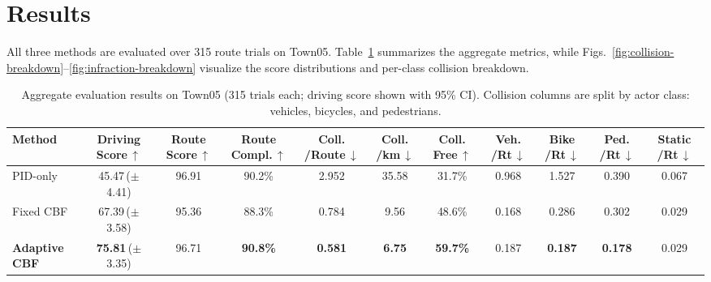 \section{Results}
\label{results}

All three methods are evaluated over 315 route trials on Town05. Table~\ref{tab:main-results} summarizes the aggregate metrics, while Figs.~\ref{fig:collision-breakdown}--\ref{fig:infraction-breakdown} visualize the score distributions and per-class collision breakdown.

\begin{table}[!htbp]
\centering
\caption{Aggregate evaluation results on Town05 (315 trials each; driving score shown with 95\% CI). Collision columns are split by actor class: vehicles, bicycles, and pedestrians.}
\label{tab:main-results}
{\scriptsize
\setlength{\tabcolsep}{5.5pt}
\begin{tabular}{lcccccccccc}
\toprule
\textbf{Method}
  & \makecell{\textbf{Driving}\\\textbf{Score\,$\uparrow$}}
  & \makecell{\textbf{Route}\\\textbf{Score\,$\uparrow$}}
  & \makecell{\textbf{Route}\\\textbf{Compl.\,$\uparrow$}}
  & \makecell{\textbf{Coll.}\\\textbf{/Route\,$\downarrow$}}
  & \makecell{\textbf{Coll.}\\\textbf{/km\,$\downarrow$}}
  & \makecell{\textbf{Coll.}\\\textbf{Free\,$\uparrow$}}
  & \makecell{\textbf{Veh.}\\\textbf{/Rt\,$\downarrow$}}
  & \makecell{\textbf{Bike}\\\textbf{/Rt\,$\downarrow$}}
  & \makecell{\textbf{Ped.}\\\textbf{/Rt\,$\downarrow$}}
  & \makecell{\textbf{Static}\\\textbf{/Rt\,$\downarrow$}} \\
\midrule
PID-only
  & 45.47\,($\pm$4.41)
  & 96.91
  & 90.2\%
  & 2.952
  & 35.58
  & 31.7\%
  & 0.968
  & 1.527
  & 0.390
  & 0.067 \\
Fixed CBF
  & 67.39\,($\pm$3.58)
  & 95.36
  & 88.3\%
  & 0.784
  & 9.56
  & 48.6\%
  & 0.168
  & 0.286
  & 0.302
  & 0.029 \\
\textbf{Adaptive CBF}
  & \textbf{75.81}\,($\pm$3.35)
  & 96.71
  & \textbf{90.8\%}
  & \textbf{0.581}
  & \textbf{6.75}
  & \textbf{59.7\%}
  & 0.187
  & \textbf{0.187}
  & \textbf{0.178}
  & 0.029 \\
\bottomrule
\end{tabular} }
\end{table}

